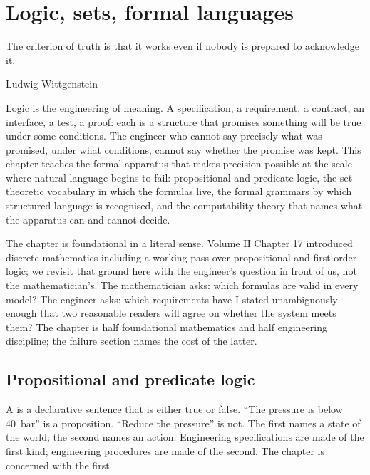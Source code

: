 \chapter{Logic, sets, formal languages}
\label{vol07:ch01}

\epigraph{The criterion of truth is that it works even if nobody is prepared to acknowledge it.}{Ludwig Wittgenstein}


\noindent
Logic is the engineering of meaning. A specification, a requirement, a contract, an interface, a test, a proof: each is a structure that promises something will be true under some conditions. The engineer who cannot say precisely what was promised, under what conditions, cannot say whether the promise was kept. This chapter teaches the formal apparatus that makes precision possible at the scale where natural language begins to fail: propositional and predicate logic, the set-theoretic vocabulary in which the formulas live, the formal grammars by which structured language is recognised, and the computability theory that names what the apparatus can and cannot decide.

The chapter is foundational in a literal sense. Volume II Chapter 17 introduced discrete mathematics including a working pass over propositional and first-order logic; we revisit that ground here with the engineer's question in front of us, not the mathematician's. The mathematician asks: which formulas are valid in every model? The engineer asks: which requirements have I stated unambiguously enough that two reasonable readers will agree on whether the system meets them? The chapter is half foundational mathematics and half engineering discipline; the failure section names the cost of the latter.

\section{Propositional and predicate logic}

A  is a declarative sentence that is either true or false. ``The pressure is below \SI{40}{\bar}'' is a proposition. ``Reduce the pressure'' is not. The first names a state of the world; the second names an action. Engineering specifications are made of the first kind; engineering procedures are made of the second. The chapter is concerned with the first.

